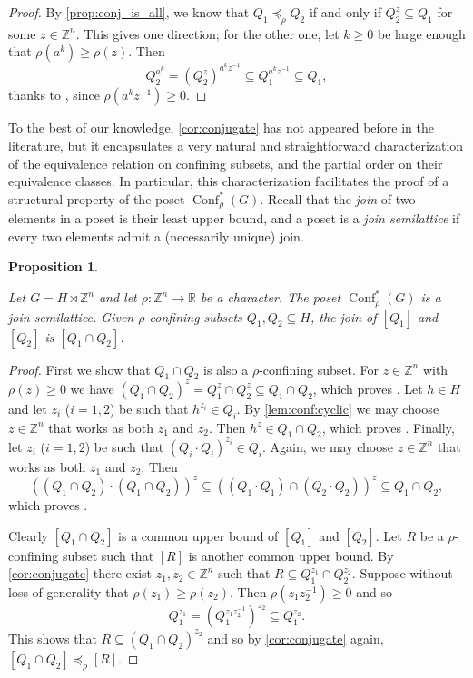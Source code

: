 \documentclass[reqno,12pt]{amsart}\setcounter{tocdepth}{1}
\newtheorem{proposition}[theorem]{Proposition}
\theoremstyle{definition}
\newcommand{\Z}{\mathbb{Z}}
\newcommand{\R}{\mathbb{R}}
\DeclareMathOperator{\Conf}{Conf}
\numberwithin{equation}{section}
\begin{document}
\begin{proof}
By \cref{prop:conj_is_all}, we know that $Q_1 \preceq_\rho Q_2$ if and only if $Q_2^z \subseteq Q_1$ for some $z \in \Z^n$. This gives one direction; for the other one, let $k \geq 0$ be large enough that $\rho(a^k) \geq \rho(z)$. Then
\[Q_2^{a^k} = (Q_2^z)^{a^k z^{-1}} \subseteq Q_1^{a^k z^{-1}} \subseteq Q_1,\]
thanks to \StayInConf, since $\rho(a^k z^{-1}) \geq 0$.
\end{proof}

To the best of our knowledge, \cref{cor:conjugate} has not appeared before in the literature, but it encapsulates a very natural and straightforward characterization of the equivalence relation on confining subsets, and the partial order on their equivalence classes. In particular, this characterization facilitates the proof of a structural property of the poset $\Conf^\ast_\rho(G)$. Recall that the \emph{join} of two elements in a poset is their least upper bound, and a poset is a \emph{join semilattice} if every two elements admit a (necessarily unique) join.

\begin{proposition}
\label{prop:join}

Let $G=H\rtimes \Z^n$ and let $\rho\colon \Z^n \to\R$ be a character. The poset $\Conf^\ast_\rho(G)$ is a join semilattice. Given $\rho$-confining subsets $Q_1, Q_2 \subseteq H$, the join of $[Q_1]$ and $[Q_2]$ is $[Q_1 \cap Q_2]$.
\end{proposition}

\begin{proof}
First we show that $Q_1 \cap Q_2$ is also a $\rho$-confining subset. For $z \in \Z^n$ with $\rho(z) \geq 0$ we have $(Q_1 \cap Q_2)^z = Q_1^z \cap Q_2^z \subseteq Q_1 \cap Q_2$, which proves \StayInConf.
Let $h \in H$ and let $z_i$ ($i=1,2$) be such that $h^{z_i} \in Q_i$. By \cref{lem:conf:cyclic} we may choose $z \in \Z^n$ that works as both $z_1$ and $z_2$. Then $h^z \in Q_1 \cap Q_2$, which proves \GetInConf.
Finally, let $z_i$ ($i=1,2$) be such that $(Q_i \cdot Q_i)^{z_i} \in Q_i$. Again, we may choose $z \in \Z^n$ that works as both $z_1$ and $z_2$. Then
\[
((Q_1 \cap Q_2) \cdot (Q_1 \cap Q_2))^{z} \subseteq ((Q_1 \cdot Q_1) \cap (Q_2 \cdot Q_2))^{z} \subseteq Q_1 \cap Q_2,
\]
which proves \ProdConf.

Clearly $[Q_1 \cap Q_2]$ is a common upper bound of $[Q_1]$ and $[Q_2]$. Let $R$ be a $\rho$-confining subset such that $[R]$ is another common upper bound. By \cref{cor:conjugate} there exist $z_1, z_2 \in \Z^n$ such that $R \subseteq Q_1^{z_1} \cap Q_2^{z_2}$. Suppose without loss of generality that $\rho(z_1) \geq \rho(z_2)$. Then $\rho(z_1 z_2^{-1}) \geq 0$ and so \[Q_1^{z_1} = (Q_1^{z_1 z_2^{-1}})^{z_2} \subseteq Q_1^{z_2}.\]
This shows that $R \subseteq (Q_1 \cap Q_2)^{z_2}$ and so by \cref{cor:conjugate} again, $[Q_1 \cap Q_2] \preccurlyeq_\rho [R]$.
\end{proof}
\end{document}
